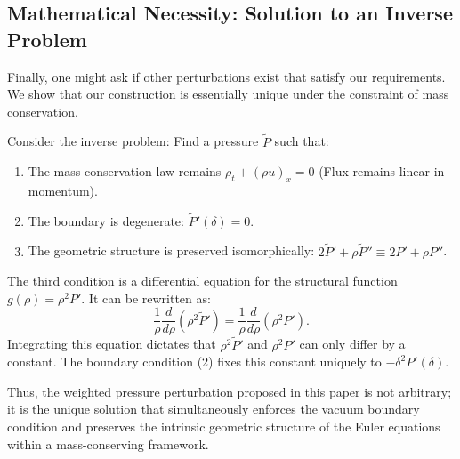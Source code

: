 \documentclass[12pt, reqno]{article}
\theoremstyle{definition}
\numberwithin{equation}{section}
\begin{document}
\subsection{Mathematical Necessity: Solution to an Inverse Problem}

Finally, one might ask if other perturbations exist that satisfy our requirements. We show that our construction is essentially unique under the constraint of mass conservation.

Consider the inverse problem: Find a pressure $\tilde{P}$ such that:
\begin{enumerate}
    \item The mass conservation law remains $\rho_t + (\rho u)_x = 0$ (Flux remains linear in momentum).
    \item The boundary is degenerate: $\tilde{P}'(\delta) = 0$.
    \item The geometric structure is preserved isomorphically: $2\tilde{P}' + \rho \tilde{P}'' \equiv 2P' + \rho P''$.
\end{enumerate}
The third condition is a differential equation for the structural function $g(\rho) = \rho^2 P'$. It can be rewritten as:
\[
\frac{1}{\rho} \frac{d}{d\rho}(\rho^2 \tilde{P}') = \frac{1}{\rho} \frac{d}{d\rho}(\rho^2 P').
\]
Integrating this equation dictates that $\rho^2 \tilde{P}'$ and $\rho^2 P'$ can only differ by a constant. The boundary condition (2) fixes this constant uniquely to $-\delta^2 P'(\delta)$.

Thus, the weighted pressure perturbation proposed in this paper is not arbitrary; it is the unique solution that simultaneously enforces the vacuum boundary condition and preserves the intrinsic geometric structure of the Euler equations within a mass-conserving framework.
\end{document}
